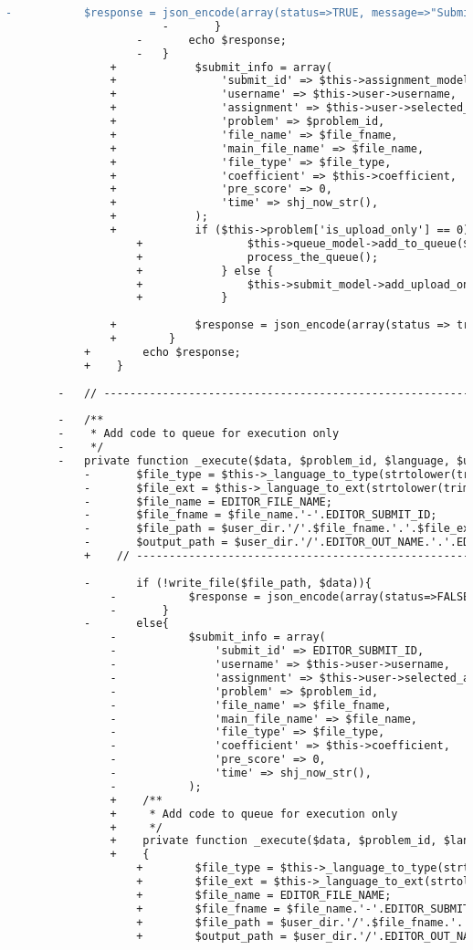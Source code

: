 \begin{lstlisting}[language=diff, caption=Perubahan pada kode Submit.php]
						-			$response = json_encode(array(status=>TRUE, message=>"Submitted"));
						-		}
					-		echo $response;
					-	}
				+            $submit_info = array(
				+                'submit_id' => $this->assignment_model->increase_total_submits($this->user->selected_assignment['id']),
				+                'username' => $this->user->username,
				+                'assignment' => $this->user->selected_assignment['id'],
				+                'problem' => $problem_id,
				+                'file_name' => $file_fname,
				+                'main_file_name' => $file_name,
				+                'file_type' => $file_type,
				+                'coefficient' => $this->coefficient,
				+                'pre_score' => 0,
				+                'time' => shj_now_str(),
				+            );
				+            if ($this->problem['is_upload_only'] == 0) {
					+                $this->queue_model->add_to_queue($submit_info);
					+                process_the_queue();
					+            } else {
					+                $this->submit_model->add_upload_only($submit_info);
					+            }
				
				+            $response = json_encode(array(status => true, message => "Submitted"));
				+        }
			+        echo $response;
			+    }
		
		-	// ------------------------------------------------------------------------
		
		-	/**
		-	 * Add code to queue for execution only
		-	 */
		-	private function _execute($data, $problem_id, $language, $user_dir){
			-		$file_type = $this->_language_to_type(strtolower(trim($language)));
			-		$file_ext = $this->_language_to_ext(strtolower(trim($language)));
			-		$file_name = EDITOR_FILE_NAME;
			-		$file_fname = $file_name.'-'.EDITOR_SUBMIT_ID;
			-		$file_path = $user_dir.'/'.$file_fname.'.'.$file_ext;
			-		$output_path = $user_dir.'/'.EDITOR_OUT_NAME.'.'.EDITOR_FILE_EXT;
			+    // ------------------------------------------------------------------------
			
			-		if (!write_file($file_path, $data)){
				-			$response = json_encode(array(status=>FALSE, message=>'Unable to execute', debug=>$file_path));
				-		}
			-		else{
				-			$submit_info = array(
				-				'submit_id' => EDITOR_SUBMIT_ID,
				-				'username' => $this->user->username,
				-				'assignment' => $this->user->selected_assignment['id'],
				-				'problem' => $problem_id,
				-				'file_name' => $file_fname,
				-				'main_file_name' => $file_name,
				-				'file_type' => $file_type,
				-				'coefficient' => $this->coefficient,
				-				'pre_score' => 0,
				-				'time' => shj_now_str(),
				-			);
				+    /**
				+     * Add code to queue for execution only
				+     */
				+    private function _execute($data, $problem_id, $language, $user_dir)
				+    {
					+        $file_type = $this->_language_to_type(strtolower(trim($language)));
					+        $file_ext = $this->_language_to_ext(strtolower(trim($language)));
					+        $file_name = EDITOR_FILE_NAME;
					+        $file_fname = $file_name.'-'.EDITOR_SUBMIT_ID;
					+        $file_path = $user_dir.'/'.$file_fname.'.'.$file_ext;
					+        $output_path = $user_dir.'/'.EDITOR_OUT_NAME.'.'.EDITOR_FILE_EXT;
					

\end{lstlisting}
